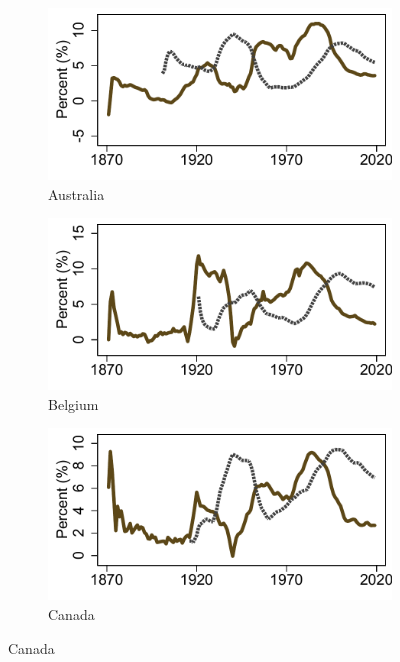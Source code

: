 \documentclass[12pt]{article}
\begin{document}
\begin{appendices}
\begin{singlespace}
\begin{figure}[ht]
    \centering
    \caption{Wage inflation (solid) and unemployment rate (dash) across countries} \label{F_median_country}
    \begin{subfigure}[b]{0.30\textwidth}
    \caption*{Australia}
    \includegraphics[width=\textwidth]{../Output/Figures/Median_dwn_unemp_Australia.pdf}   
    \end{subfigure}
    \begin{subfigure}[b]{0.30\textwidth}
    \caption*{Belgium}
    \includegraphics[width=\textwidth]{../Output/Figures/Median_dwn_unemp_Belgium.pdf}   
    \end{subfigure}
    \begin{subfigure}[b]{0.30\textwidth}
    \caption*{Canada}
    \includegraphics[width=\textwidth]{../Output/Figures/Median_dwn_unemp_Canada.pdf}   

\end{subfigure}
\end{figure}
\end{singlespace}
\end{appendices}
\end{document}
